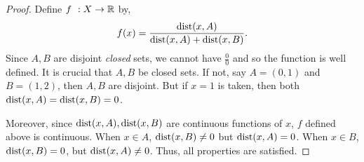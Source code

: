 \begin{proof}
    Define ${f}\hspace{0.05in}:{X}\to{\mathbb{R}}$ by,
    \[f(x) = \frac{\operatorname{dist}(x,A)}{\operatorname{dist}(x,A) + \operatorname{dist}(x,B)}.\]
    Since $A,B$ are disjoint \emph{closed} sets, we cannot have $\frac{0}{0}$ and so the function is well
    defined. It is crucial that $A,B$ be closed sets. If not, say $A = (0,1)$ and $B = (1,2)$, then $A,B$ are
    disjoint. But if $x = 1$ is taken, then both $\operatorname{dist}(x,A) = \operatorname{dist}(x,B) = 0$.

    Moreover, since $\operatorname{dist}(x,A),\operatorname{dist}(x,B)$ are continuous functions of $x$, $f$ defined above is continuous. 
    When $x \in A$, $\operatorname{dist}(x,B) \neq 0$ but $\operatorname{dist}(x,A) = 0$. When $x \in B$, $\operatorname{dist}(x,B) = 0$, but 
    $\operatorname{dist}(x,A) \neq 0$. Thus, all properties are satisfied.
\end{proof}


